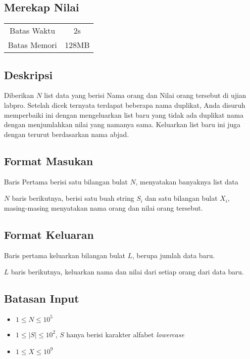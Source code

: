 \documentclass{article}
\begin{document}
\begin{center}
    \section*{Merekap Nilai} %

    \begin{tabular}{ | c c | }
        \hline
        Batas Waktu  & 2s \\    %
        Batas Memori & 128MB \\  %
        \hline
    \end{tabular}
\end{center}

\subsection*{Deskripsi}

Diberikan $N$ list data yang berisi Nama orang dan Nilai orang tersebut di ujian labpro. Setelah dicek ternyata terdapat beberapa nama duplikat, Anda disuruh memperbaiki ini dengan mengeluarkan list baru yang tidak ada duplikat nama dengan menjumlahkan nilai yang namanya sama. Keluarkan list baru ini juga dengan terurut berdasarkan nama abjad.

\subsection*{Format Masukan}
Baris Pertama berisi satu bilangan bulat $N$, menyatakan banyaknya list data

$N$ baris berikutnya, berisi satu buah string $S_i$ dan satu bilangan bulat $X_i$, masing-masing menyatakan nama orang dan nilai orang tersebut.


\subsection*{Format Keluaran}
Baris pertama keluarkan bilangan bulat $L$, berupa jumlah data baru.

$L$ baris berikutnya, keluarkan nama dan nilai dari setiap orang dari data baru.

\subsection*{Batasan Input}

\begin{itemize}
    \item{$1 \leq N \leq 10^5$}
    \item{$1 \leq |S| \leq 10^2$, $S$ hanya berisi karakter alfabet \textit{lowercase}}
    \item{$1 \leq X \leq 10^9$}
\end{itemize}
\end{document}
